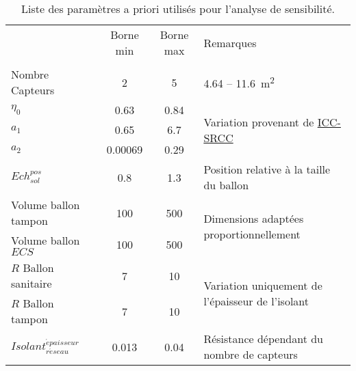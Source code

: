 \begin{table}
\centering
\caption{Liste des paramètres a priori utilisés pour l’analyse de sensibilité.}
\label{tab:facteur_sensibilite}
\begin{tabular}{l c c l}
  \toprule
  \addlinespace
                                               & Borne min     & Borne max   & Remarques                                                            \\
  \addlinespace
  \multicolumn{4}{l}{\bm{$SSC$}}                                                                           \\
  \midrule
  Nombre Capteurs                              & \num{2}       & \num{5}     & \num{4.64} -- \SI{11.6}{\metre\squared}                              \\
  $\eta_{0}$                                   & \num{0.63}    & \num{0.84}  & \multirow{3}{*}{Variation provenant de \href{www.solar-rating.org}{ICC-SRCC}}   \\
  $a_{1}$                                      & \num{0.65}    & \num{6.7}   &                                                                      \\
  $a_{2}$                                      & \num{0.00069} & \num{0.29}  &                                                                      \\
  $Ech_{sol}^{pos}$                            & \num{0.8}     & \num{1.3}   & Position relative à la taille du ballon                              \\
  Volume ballon tampon                         & \num{100}     & \num{500}   & \multirow{2}{*}{Dimensions adaptées proportionnellement}             \\
  Volume ballon $ECS$                          & \num{100}     & \num{500}   &                                                                      \\
  $R$ Ballon sanitaire                         & \num{7}       & \num{10}    & \multirow{2}{*}{Variation uniquement de l’épaisseur de l’isolant}    \\
  $R$ Ballon tampon                            & \num{7}       & \num{10}    &                                                                      \\
  $Isolant_{r\acute eseau}^{\acute epaisseur}$ & \num{0.013}   & \num{0.04}  & Résistance dépendant du nombre de capteurs                           \\

\end{tabular}
\end{table}
